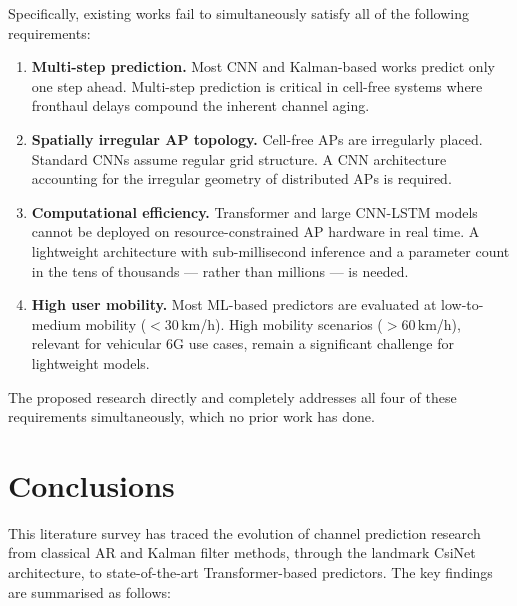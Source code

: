 \documentclass[12pt,a4paper]{article}
\begin{document}
Specifically, existing works fail to simultaneously satisfy all of the
following requirements:

\begin{enumerate}
  \item \textbf{Multi-step prediction.} Most CNN and Kalman-based
        works predict only one step ahead. Multi-step prediction is
        critical in cell-free systems where fronthaul delays compound
        the inherent channel aging.

  \item \textbf{Spatially irregular AP topology.} Cell-free APs are
        irregularly placed. Standard CNNs assume regular grid structure.
        A CNN architecture accounting for the irregular geometry of
        distributed APs is required.

  \item \textbf{Computational efficiency.} Transformer and large
        CNN-LSTM models cannot be deployed on resource-constrained AP
        hardware in real time. A lightweight architecture with
        sub-millisecond inference and a parameter count in the tens of
        thousands --- rather than millions --- is needed.

  \item \textbf{High user mobility.} Most ML-based predictors are
        evaluated at low-to-medium mobility ($< 30$\,km/h). High
        mobility scenarios ($> 60$\,km/h), relevant for vehicular 6G
        use cases, remain a significant challenge for lightweight models.
\end{enumerate}

The proposed research directly and completely addresses all four of these
requirements simultaneously, which no prior work has done.

\section{Conclusions}

This literature survey has traced the evolution of channel prediction
research from classical AR and Kalman filter methods, through the
landmark CsiNet architecture, to state-of-the-art Transformer-based
predictors. The key findings are summarised as follows:
\end{document}
